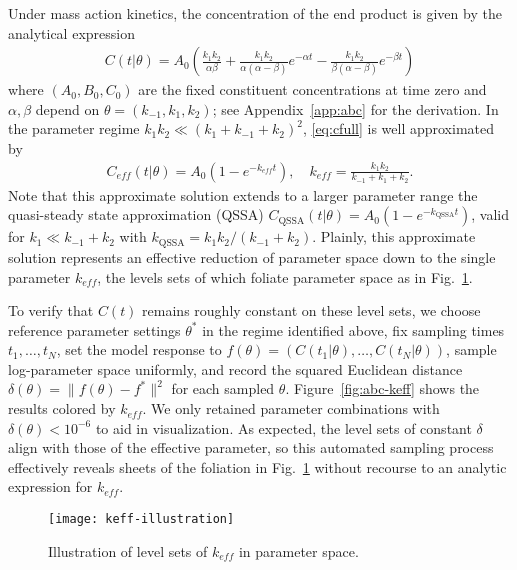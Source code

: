 Under mass action kinetics, the concentration of the end product is
given by the analytical expression
% 
\begin{align}
  C(t|\theta)
  =
  A_0
  \left(
  \frac{k_1 k_2}{\alpha \beta}
  +
  \frac{k_1 k_2}{\alpha(\alpha - \beta)}
  e^{-\alpha t}
  -
  \frac{k_1 k_2}{\beta(\alpha - \beta)}
  e^{-\beta t}
  \right)
  \label{eq:cfull}
\end{align}
% 
where $(A_0,B_0,C_0)$ are the fixed constituent concentrations at time
zero and $\alpha,\beta$ depend on $\theta=(k_{-1},k_1,k_2)$; see
Appendix~\ref{app:abc} for the derivation. In the parameter regime
$k_1 k_2 \ll (k_1 + k_{-1} + k_2)^2$, \eqref{eq:cfull} is well
approximated by
% 
\begin{align}
  C_{eff}(t|\theta)
  =
  A_0
  \left(
  1 - e^{-k_{eff} t}
  \right) ,
  \quad
  k_{eff}
  =
  \frac{k_1 k_2}{k_{-1} + k_1 + k_2} .
  \label{ABC-QSSA}
\end{align}
% 
Note that this approximate solution extends to a larger parameter
range the quasi-steady state approximation (QSSA)
$C_\mathrm{QSSA}(t|\theta) = A_0 (1 - e^{-k_\mathrm{QSSA} t})$, valid
for $k_1 \ll k_{-1} + k_2$ with
$k_\mathrm{QSSA}=k_1 k_2/(k_{-1} + k_2)$.  Plainly, this approximate
solution represents an effective reduction of parameter space down to
the single parameter $k_{eff}$, the levels sets of which foliate
parameter space as in Fig.~\ref{fig:abc-ill}.

To verify that $C(t)$ remains roughly constant on these level sets, we
choose reference parameter settings $\theta^*$ in the regime
identified above, fix sampling times $t_1,\ldots,t_N$, set the model
response to $f(\theta)=( C(t_1|\theta) , \ldots , C(t_N|\theta) )$,
sample log-parameter space uniformly, and record the squared Euclidean
distance $\delta(\theta) = \| f(\theta) - f^* \|^2$ for each sampled
$\theta$.  Figure~\ref{fig:abc-keff} shows the results colored by
$k_{eff}$. We only retained parameter combinations with
$\delta(\theta) < 10^{-6}$ to aid in visualization. As expected, the
level sets of constant $\delta$ align with those of the effective
parameter, so this automated sampling process effectively reveals
sheets of the foliation in Fig.~\ref{fig:abc-ill} without recourse to
an analytic expression for $k_{eff}$.

\begin{figure}[!htp]
  \centering
  \texttt{[image: keff-illustration]}
  \caption[Illustration of level sets of the effective parameter in a
  model of chemical kinetics]{Illustration of level sets of $k_{eff}$
    in parameter space. \label{fig:abc-ill}}
\end{figure}


